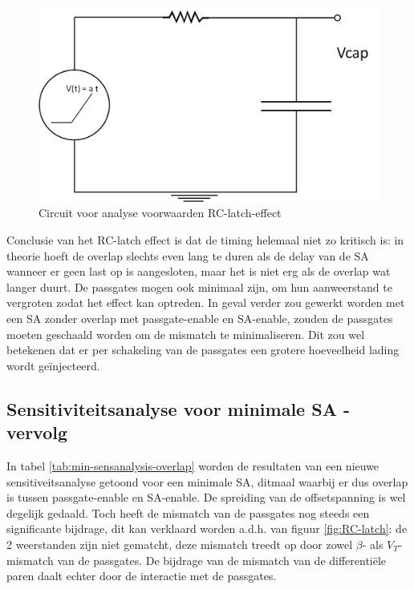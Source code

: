 \begin{figure}
  \centering
  \includegraphics[scale=0.4]{../fig/hfdstk-sensamp-RC-latch-maplecircuit.png}
  \caption[Circuit voor analyse voorwaarden RC-latch-effect]{Circuit voor analyse voorwaarden RC-latch-effect}
  \label{fig:RC-latch-maplecircuit}
\end{figure}

Conclusie van het RC-latch effect is dat de timing helemaal niet zo kritisch is: in theorie hoeft de overlap slechts even lang te duren als de delay van de SA wanneer er geen last op is aangesloten, maar het is niet erg als de overlap wat langer duurt.
De passgates mogen ook minimaal zijn, om hun aanweerstand te vergroten zodat het effect kan optreden.
In geval verder zou gewerkt worden met een SA zonder overlap met passgate-enable en SA-enable, zouden de passgates moeten geschaald worden om de mismatch te minimaliseren. Dit zou wel betekenen dat er per schakeling van de passgates een grotere hoeveelheid lading wordt geïnjecteerd.


\subsection{Sensitiviteitsanalyse voor minimale SA - vervolg}

In tabel \ref{tab:min-sensanalysis-overlap} worden de resultaten van een nieuwe sensitiveitsanalyse getoond voor een minimale SA, ditmaal waarbij er dus overlap is tussen passgate-enable en SA-enable. De spreiding van de offsetspanning is wel degelijk gedaald. Toch heeft de mismatch van de passgates nog steeds een significante bijdrage, dit kan verklaard worden a.d.h. van figuur \ref{fig:RC-latch}: de 2 weerstanden zijn niet gematcht, deze mismatch treedt op door zowel $\beta$- als $V_{T}$-mismatch van de passgates. De bijdrage van de mismatch van de differentiële paren daalt echter door de interactie met de passgates.


